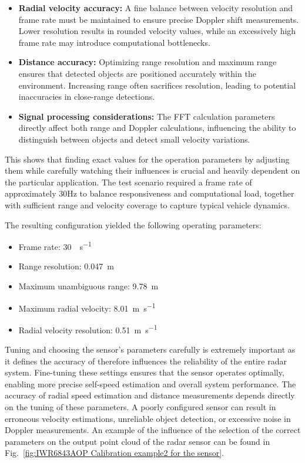 \begin{itemize}
\item \textbf{Radial velocity accuracy:} A fine balance between velocity resolution and frame rate must be maintained to ensure precise Doppler shift measurements. Lower resolution results in rounded velocity values, while an excessively high frame rate may introduce computational bottlenecks.
\item \textbf{Distance accuracy:} Optimizing range resolution and maximum range ensures that detected objects are positioned accurately within the environment. Increasing range often sacrifices resolution, leading to potential inaccuracies in close-range detections.
\item \textbf{Signal processing considerations:} The FFT calculation parameters directly affect both range and Doppler calculations, influencing the ability to distinguish between objects and detect small velocity variations.
\end{itemize}

This shows that finding exact values for the operation parameters by adjusting them while carefully watching their influences is crucial and heavily dependent on the particular application.
The test scenario required a frame rate of approximately 30Hz to balance responsiveness and computational load, together with sufficient range and velocity coverage to capture typical vehicle dynamics.

The resulting configuration yielded the following operating parameters:
\begin{itemize}
\item Frame rate: \SI{30}{\frame\per\second}
\item Range resolution: \SI{0.047}{\meter}
\item Maximum unambiguous range: \SI{9.78}{\meter}
\item Maximum radial velocity: \SI{8.01}{\meter\per\second}
\item Radial velocity resolution: \SI{0.51}{\meter\per\second}
\end{itemize}

Tuning and choosing the sensor's parameters carefully is extremely important as it defines the accuracy of 
therefore influences the reliability of the entire radar system.
Fine-tuning these settings ensures that the sensor operates optimally, enabling more precise self-speed estimation and overall system performance.
The accuracy of radial speed estimation and distance measurements depends directly on the tuning of these parameters. A poorly configured sensor can result in erroneous velocity estimations, unreliable object detection, or excessive noise in Doppler measurements. 
An example of the influence of the selection of the correct parameters on the output point cloud of the radar sensor can be found in Fig.~\ref{fig:IWR6843AOP Calibration example2 for the sensor}.


